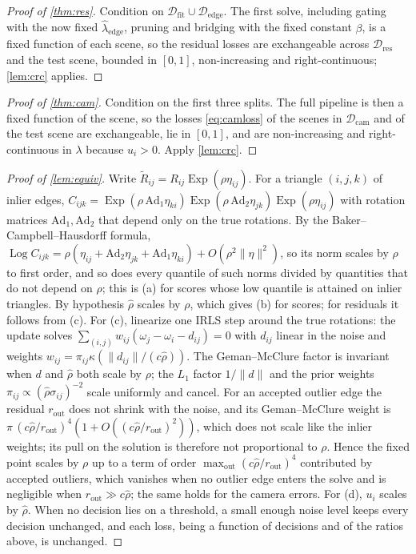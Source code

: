 \begin{proof}[Proof of \cref{thm:res}]
Condition on $\mathcal{D}_{\mathrm{fit}}\cup\mathcal{D}_{\mathrm{edge}}$. The first solve, including gating with the now fixed $\hat\lambda_{\mathrm{edge}}$, pruning and bridging with the fixed constant $\beta$, is a fixed function of each scene, so the residual losses are exchangeable across $\mathcal{D}_{\mathrm{res}}$ and the test scene, bounded in $[0,1]$, non-increasing and right-continuous; \cref{lem:crc} applies.
\end{proof}

\begin{proof}[Proof of \cref{thm:cam}]
Condition on the first three splits. The full pipeline is then a fixed function of the scene, so the losses \eqref{eq:camloss} of the scenes in $\mathcal{D}_{\mathrm{cam}}$ and of the test scene are exchangeable, lie in $[0,1]$, and are non-increasing and right-continuous in $\lambda$ because $u_i>0$. Apply \cref{lem:crc}.
\end{proof}

\begin{proof}[Proof of \cref{lem:equiv}]
Write $\tilde R_{ij}=R_{ij}\operatorname{Exp}(\rho\eta_{ij})$. For a triangle $(i,j,k)$ of inlier edges, $C_{ijk}=\operatorname{Exp}(\rho\,\mathrm{Ad}_1\eta_{ki})\operatorname{Exp}(\rho\,\mathrm{Ad}_2\eta_{jk})\operatorname{Exp}(\rho\eta_{ij})$ with rotation matrices $\mathrm{Ad}_1,\mathrm{Ad}_2$ that depend only on the true rotations. By the Baker--Campbell--Hausdorff formula, $\operatorname{Log}C_{ijk}=\rho(\eta_{ij}+\mathrm{Ad}_2\eta_{jk}+\mathrm{Ad}_1\eta_{ki})+O(\rho^2\|\eta\|^2)$, so its norm scales by $\rho$ to first order, and so does every quantile of such norms divided by quantities that do not depend on $\rho$; this is (a) for scores whose low quantile is attained on inlier triangles. By hypothesis $\hat\rho$ scales by $\rho$, which gives (b) for scores; for residuals it follows from (c). For (c), linearize one IRLS step around the true rotations: the update solves $\sum_{(i,j)}w_{ij}(\omega_j-\omega_i-d_{ij})=0$ with $d_{ij}$ linear in the noise and weights $w_{ij}=\pi_{ij}\kappa(\|d_{ij}\|/(c\hat\rho))$. The Geman--McClure factor is invariant when $d$ and $\hat\rho$ both scale by $\rho$; the $L_1$ factor $1/\|d\|$ and the prior weights $\pi_{ij}\propto(\hat\rho\sigma_{ij})^{-2}$ scale uniformly and cancel. For an accepted outlier edge the residual $r_{\mathrm{out}}$ does not shrink with the noise, and its Geman--McClure weight is $\pi\,(c\hat\rho/r_{\mathrm{out}})^4(1+O((c\hat\rho/r_{\mathrm{out}})^2))$, which does not scale like the inlier weights; its pull on the solution is therefore not proportional to $\rho$. Hence the fixed point scales by $\rho$ up to a term of order $\max_{\mathrm{out}}(c\hat\rho/r_{\mathrm{out}})^4$ contributed by accepted outliers, which vanishes when no outlier edge enters the solve and is negligible when $r_{\mathrm{out}}\gg c\hat\rho$; the same holds for the camera errors. For (d), $u_i$ scales by $\hat\rho$. When no decision lies on a threshold, a small enough noise level keeps every decision unchanged, and each loss, being a function of decisions and of the ratios above, is unchanged.
\end{proof}

